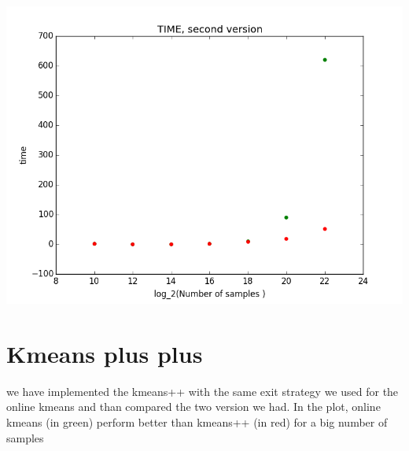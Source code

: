 \documentclass[12pt]{article}
\begin{document}
\begin{table}
\includegraphics[scale=0.4]{time_secondVersion.png}
  \end{table}
  
  
  \newpage
\section{Kmeans plus plus}
we have implemented the kmeans++ with the same exit strategy we used for the online kmeans and than compared the two version we had. In the plot, online kmeans (in green) perform better than kmeans++ (in red) for a big number of samples 

  
  
\end{document}

